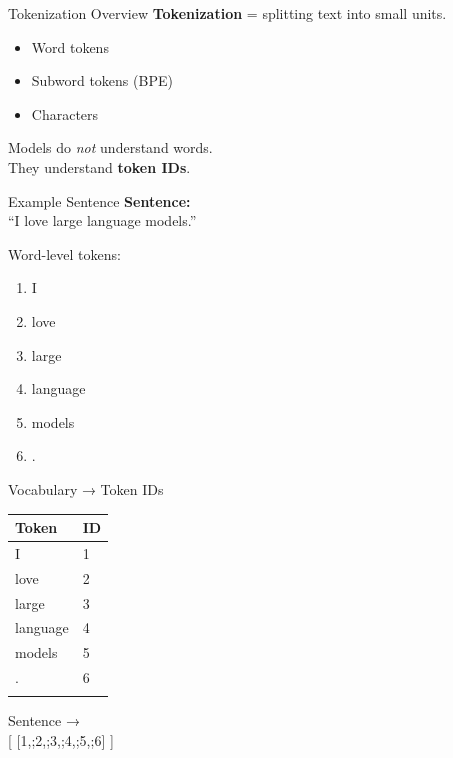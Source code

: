 \documentclass[
  ignorenonframetext,
]{beamer}
\providecommand{\tightlist}{%
  \setlength{\itemsep}{0pt}\setlength{\parskip}{0pt}}
\begin{document}
\begin{frame}{Tokenization Overview}
\label{tokenization-overview}
\textbf{Tokenization} = splitting text into small units.

\begin{itemize}
\tightlist
\item
  Word tokens\\
\item
  Subword tokens (BPE)\\
\item
  Characters
\end{itemize}

Models do \emph{not} understand words.\\
They understand \textbf{token IDs}.
\end{frame}

\begin{frame}{Example Sentence}
\label{example-sentence}
\textbf{Sentence:}\\
``I love large language models.''

\begin{block}{Word-level tokens:}
\label{word-level-tokens}
\begin{enumerate}
\tightlist
\item
  I\\
\item
  love\\
\item
  large\\
\item
  language\\
\item
  models\\
\item
  .
\end{enumerate}
\end{block}
\end{frame}

\begin{frame}{Vocabulary → Token IDs}
\label{vocabulary-token-ids}
\begin{longtable}[]{@{}ll@{}}
\toprule\noalign{}
Token & ID \\
\midrule\noalign{}
\endhead
I & 1 \\
love & 2 \\
large & 3 \\
language & 4 \\
models & 5 \\
. & 6 \\
\bottomrule\noalign{}
\end{longtable}

Sentence →\\
{[} {[}1,;2,;3,;4,;5,;6{]} {]}
\end{frame}
\end{document}
